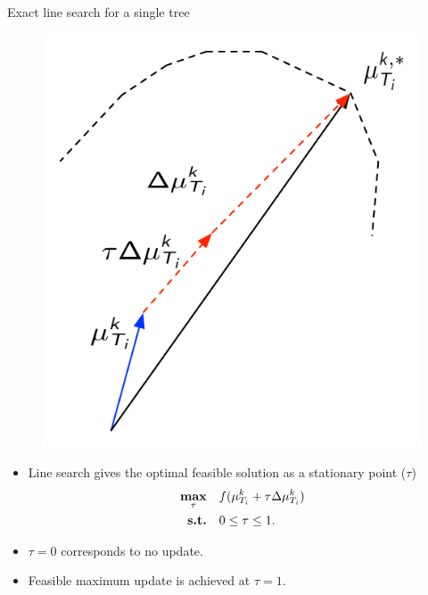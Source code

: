 \documentclass[first=dgreen,second=purple,logo=yellowexc]{aaltoslides}
\begin{document}
\iffalse
\begin{frame}{Exact line search for a single tree}
	\begin{figure}
		\begin{center}
			\includegraphics[scale=0.3]{optimization_single_tree.pdf}
		\end{center}
	\end{figure}
	\begin{itemize}
		\item Line search gives the optimal feasible solution as a stationary point ($\tau$)
		\begin{align}
			\underset{\tau}{\textbf{max}} &\quad f(\mathbf {\mu}_{T_i}^k + \tau\Delta\mathbf {\mu}_{T_i}^{k})\label{tree_line_search}\\
			\textbf{s.t.} &\quad 0\le\tau\le1.\nonumber
		\end{align}
		\item $\tau=0$ corresponds to no update.
		\item Feasible maximum update is achieved at $\tau=1$. 
	\end{itemize}
\end{frame}
\end{document}
